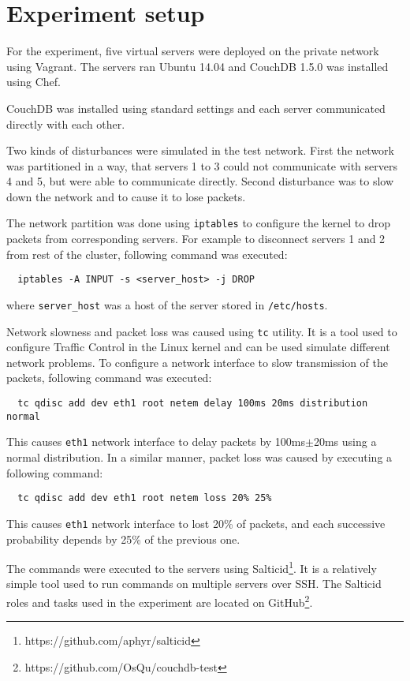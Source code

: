 \section{Experiment setup}


For the experiment, five virtual servers were deployed on the private network
using Vagrant. The servers ran Ubuntu 14.04 and CouchDB 1.5.0 was installed
using Chef.

CouchDB was installed using standard settings and each server communicated
directly with each other.


Two kinds of disturbances were simulated in the test network. First the network
was partitioned in a way, that servers 1 to 3 could not communicate with servers
4 and 5, but were able to communicate directly. Second disturbance was to slow
down the network and to cause it to lose packets.

The network partition was done using \texttt{iptables} to configure the kernel
to drop packets from corresponding servers. For example to disconnect servers 1
and 2 from rest of the cluster, following command was executed:

\begin{verbatim}
  iptables -A INPUT -s <server_host> -j DROP
\end{verbatim}

where \texttt{server\_host} was a host of the server stored in
\texttt{/etc/hosts}.

Network slowness and packet loss was caused using \texttt{tc} utility. It is a
tool used to configure Traffic Control in the Linux kernel and can be used
simulate different network problems. To configure a network interface to slow
transmission of the packets, following command was executed:

\begin{verbatim}
  tc qdisc add dev eth1 root netem delay 100ms 20ms distribution normal
\end{verbatim}

This causes \texttt{eth1} network interface to delay packets by 100ms\(\pm\)20ms
using a normal distribution. In a similar manner, packet loss was caused by
executing a following command:

\begin{verbatim}
  tc qdisc add dev eth1 root netem loss 20% 25%
\end{verbatim}

This causes \texttt{eth1} network interface to lost 20\% of packets, and each
successive probability depends by 25\% of the previous one.

The commands were executed to the servers using
Salticid\footnote{https://github.com/aphyr/salticid}. It is a relatively simple
tool used to run commands on multiple servers over SSH\@. The Salticid roles and
tasks used in the experiment are located on
GitHub\footnote{https://github.com/OsQu/couchdb-test}.
